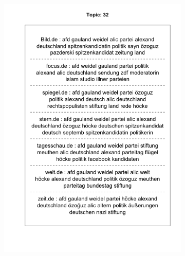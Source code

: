 \documentclass[12pt,a4paper,notitlepage]{article}
\begin{document}
\begin{figure}[H]
\begin{center}
\begin{subfigure}[normla]{0.49\textwidth}
			\includegraphics[width=\textwidth]{figs/plotquote32.png}
		\end{subfigure}
	\end{center}
\end{figure}
\end{document}

